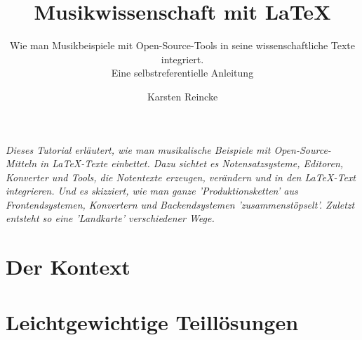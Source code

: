 \documentclass[
  DIV=calc,
  BCOR=5mm,
  12pt,
  headings=small,
  twoside,
  abstract=true,
  toc=bib,
  xcolor=dvipsnames,
  openany,
  english,ngerman]{scrbook}
\begin{document}
\nocite{*}

\titlehead{\textit{mycsrf} und Musik}
\subject{Release }
\title{Musikwissenschaft mit \LaTeX}
\subtitle{Wie man Musikbeispiele mit Open-Source-Tools 
in seine wissenschaftliche Texte integriert.\\
{\small Eine selbstreferentielle Anleitung}}
\author{Karsten Reincke}


\maketitle

\textit{Dieses Tutorial erläutert, wie man musikalische Beispiele mit
Open-Source-Mitteln in \LaTeX-Texte einbettet. Dazu sichtet es Notensatzsysteme,
Editoren, Konverter und Tools, die Notentexte erzeugen, verändern und in den
\LaTeX-Text integrieren. Und es skizziert, wie man ganze 'Produktionsketten' aus
Frontendsystemen, Konvertern und Backendsystemen 'zusammenstöpselt'. Zuletzt
entsteht so eine 'Landkarte' verschiedener Wege.
}



\footnotesize
\tableofcontents

\normalsize
\setcounter{chapter}{-1}
\chapter{Der Kontext}





\chapter{Leichtgewichtige Teillösungen}
\end{document}
